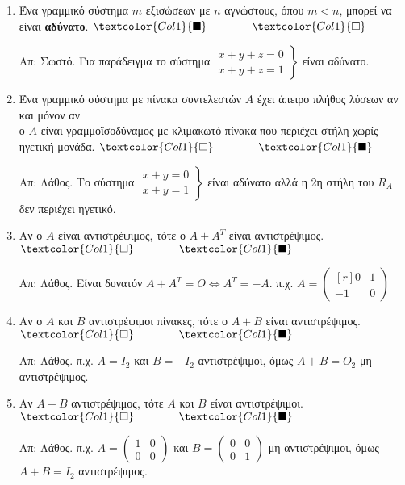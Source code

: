 \begin{enumerate}[itemsep=.5\baselineskip]
  \item \textcolor{Col1}{Ένα γραμμικό σύστημα $m$ εξισώσεων με $n$ αγνώστους, όπου 
    $ m<n $, μπορεί να είναι \textbf{αδύνατο}}.
    \hfill $\textcolor{Col1}{\blacksquare} \qquad \qquad \textcolor{Col1}{\square}$

    Απ: Σωστό. Για παράδειγμα το σύστημα $ \left.
      \begin{matrix}
        x+y+z=0 \\
        x+y+z=1
      \end{matrix} 
    \right\} $ είναι αδύνατο.

  \item \textcolor{Col1}{Ένα γραμμικό σύστημα με πίνακα συντελεστών $ A $ έχει 
      άπειρο πλήθος λύσεων αν και μόνον αν \\ ο $A$ είναι γραμμοϊσοδύναμος με κλιμακωτό 
    πίνακα που περιέχει στήλη χωρίς ηγετική μονάδα}.
    \hfill $\textcolor{Col1}{\square} \qquad \qquad \textcolor{Col1}{\blacksquare}$

    Απ: Λάθος. Το σύστημα $ \left.
      \begin{matrix}
        x+y=0 \\
        x+y=1
      \end{matrix} 
    \right\}$ είναι αδύνατο αλλά η 2η στήλη του $R_{A}$ δεν περιέχει ηγετικό.

  \item \textcolor{Col1}{Αν ο $A$ είναι αντιστρέψιμος, τότε ο $ A+A^{T} $ είναι
    αντιστρέψιμος}.
    \hfill $\textcolor{Col1}{\square} \qquad \qquad \textcolor{Col1}{\blacksquare}$

    Απ: Λάθος. Είναι δυνατόν $ A + A^{T} = O \Leftrightarrow A^{T}=-A $. π.χ. $ A = 
    \begin{pmatrix*}[r]
      0 & 1 \\
      -1 & 0
    \end{pmatrix*} $

  \item \textcolor{Col1}{Αν ο $A$ και $ B $ αντιστρέψιμοι πίνακες, τότε ο $ A+Β $ 
      είναι αντιστρέψιμος}.
    \hfill $\textcolor{Col1}{\square} \qquad \qquad \textcolor{Col1}{\blacksquare}$

    Απ: Λάθος. π.χ. $ A=I_{2} $ και $ B=-I_{2} $ αντιστρέψιμοι, όμως $ A+B=O_{2} $ 
    μη αντιστρέψιμος.

  \item \textcolor{Col1}{Αν $ A+B $ αντιστρέψιμος, τότε $ A $ και $ B $ είναι 
    αντιστρέψιμοι}.
    \hfill $\textcolor{Col1}{\square} \qquad \qquad \textcolor{Col1}{\blacksquare}$

    Απ: Λάθος. π.χ. $ A= 
    \begin{pmatrix}
      1 & 0 \\
      0 & 0
    \end{pmatrix} $ και $ B = 
    \begin{pmatrix}
      0 & 0 \\
      0 & 1
    \end{pmatrix} $ μη αντιστρέψιμοι, όμως $ A+B=I_{2} $ αντιστρέψιμος.
\end{enumerate}





